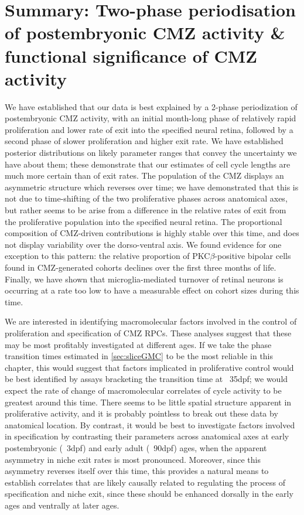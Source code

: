 \section{Summary: Two-phase periodisation of postembryonic CMZ activity \& functional significance of CMZ activity}
We have established that our data is best explained by a 2-phase periodization of postembryonic CMZ activity, with an initial month-long phase of relatively rapid proliferation and lower rate of exit into the specified neural retina, followed by a second phase of slower proliferation and higher exit rate. We have established posterior distributions on likely parameter ranges that convey the uncertainty we have about them; these demonstrate that our estimates of cell cycle lengths are much more certain than of exit rates.  The population of the CMZ displays an asymmetric structure which reverses over time; we have demonstrated that this is not due to time-shifting of the two proliferative phases across anatomical axes, but rather seems to be arise from a difference in the relative rates of exit from the proliferative population into the specified neural retina. The proportional composition of CMZ-driven contributions is highly stable over this time, and does not display variability over the dorso-ventral axis. We found evidence for one exception to this pattern: the relative proportion of PKC$\beta$-positive bipolar cells found in CMZ-generated cohorts declines over the first three months of life. Finally, we have shown that microglia-mediated turnover of retinal neurons is occurring at a rate too low to have a measurable effect on cohort sizes during this time.

We are interested in identifying macromolecular factors involved in the control of proliferation and specification of CMZ RPCs. These analyses suggest that these may be most profitably investigated at different ages. If we take the phase transition times estimated in \autoref{sec:sliceGMC} to be the most reliable in this chapter, this would suggest that factors implicated in proliferative control would be best identified by assays bracketing the transition time at ~35dpf; we would expect the rate of change of macromolecular correlates of cycle activity to be greatest around this time. There seems to be little spatial structure apparent in proliferative activity, and it is probably pointless to break out these data by anatomical location. By contrast, it would be best to investigate factors involved in specification by contrasting their parameters across anatomical axes at early postembryonic (~3dpf) and early adult (~90dpf) ages, when the apparent asymmetry in niche exit rates is most pronounced. Moreover, since this asymmetry reverses itself over this time, this provides a natural means to establish correlates that are likely causally related to regulating the process of specification and niche exit, since these should be enhanced dorsally in the early ages and ventrally at later ages.

